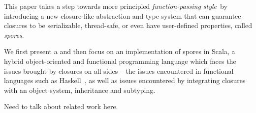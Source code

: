 \documentclass{llncs}
\begin{document}

This paper takes a step towards more principled {\em function-passing
style}~by
introducing a new closure-like abstraction and type system that can guarantee
closures to be serializable, thread-safe, or even have user-defined
properties, called {\em spores}.

We first present a and then focus on an implementation of spores in Scala, a
hybrid object-oriented and functional programming language which faces the
issues brought by closures on all sides -- the issues encountered in
functional languages such as Haskell~\cite{CloudHaskell}, as well as issues
encountered by integrating closures with an object system, inheritance and
subtyping.

Need to talk about related work here.






\end{document}
